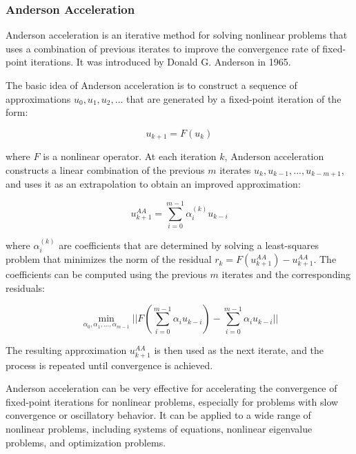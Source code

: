 \subsubsection{Anderson Acceleration}
\label{subsubsec:anderson_acceleration}


Anderson acceleration is an iterative method for solving nonlinear problems that uses a combination of previous iterates to improve the convergence rate of fixed-point iterations. It was introduced by Donald G. Anderson in 1965.

The basic idea of Anderson acceleration is to construct a sequence of approximations $u_0, u_1, u_2, ...$ that are generated by a fixed-point iteration of the form:

\begin{equation}
  u_{k+1} = F(u_k)
\end{equation}

where $F$ is a nonlinear operator. At each iteration $k$, Anderson acceleration constructs a linear combination of the previous $m$ iterates $u_k, u_{k-1}, ..., u_{k-m+1}$, and uses it as an extrapolation to obtain an improved approximation:

\begin{equation}
  u_{k+1}^{AA} = \sum_{i=0}^{m-1} \alpha_i^{(k)} u_{k-i}
\end{equation}

where $\alpha_i^{(k)}$ are coefficients that are determined by solving a least-squares problem that minimizes the norm of the residual $r_k = F(u_{k+1}^{AA}) - u_{k+1}^{AA}$. The coefficients can be computed using the previous $m$ iterates and the corresponding residuals:

\begin{equation}
  \min_{\alpha_0, \alpha_1, ..., \alpha_{m-1}} ||F(\sum_{i=0}^{m-1} \alpha_i u_{k-i}) - \sum_{i=0}^{m-1} \alpha_i u_{k-i}||
\end{equation}

The resulting approximation $u_{k+1}^{AA}$ is then used as the next iterate, and the process is repeated until convergence is achieved.

Anderson acceleration can be very effective for accelerating the convergence of fixed-point iterations for nonlinear problems, especially for problems with slow convergence or oscillatory behavior. It can be applied to a wide range of nonlinear problems, including systems of equations, nonlinear eigenvalue problems, and optimization problems.

